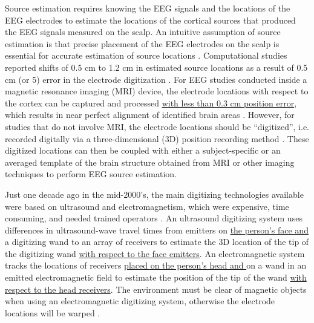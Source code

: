 \documentclass[../thesis_seyed.tex]{subfiles}
\begin{document}
Source estimation requires knowing the EEG signals and the locations of the EEG electrodes to estimate the locations of the cortical sources that produced the EEG signals measured on the scalp. An intuitive assumption of source estimation is that precise placement of the EEG electrodes on the scalp is essential for accurate estimation of source locations \cite{Keil2014-mv}. Computational studies reported shifts of 0.5 cm to 1.2 cm in estimated source locations as a result of 0.5 cm (or 5\textdegree) error in the electrode digitization \cite{Kavanagk1978-zc,Khosla1999-bz,Wang2001-fp,Beltrachini2011-je,Akalin_Acar2013-rv}. For EEG studies conducted inside a magnetic resonance imaging (MRI) device, the electrode locations with respect to the cortex can be captured and processed \ul{with less than 0.3 cm position error}, which results in near perfect alignment of identified brain areas \cite{Marino2016-pu,Scarff2004-ll}. However, for studies that do not involve MRI, the electrode locations should be ``digitized'', i.e. recorded digitally via a three-dimensional (3D) position recording method \cite{Koessler2007-qg}. These digitized locations can then be coupled with either a subject-specific or an averaged template of the brain structure obtained from MRI or other imaging techniques to perform EEG source estimation.  

Just one decade ago in the mid-2000's, the main digitizing technologies available were based on ultrasound and electromagnetism, which were expensive, time consuming, and needed trained operators \cite{Koessler2007-qg,Rodriguez-Calvache2018-qi}. An ultrasound digitizing system uses differences in ultrasound-wave travel times from emitters on \ul{the person's face and} a digitizing wand to an array of receivers to estimate the 3D location of the tip of the digitizing wand \ul{with respect to the face emitters}. An electromagnetic system tracks the locations of receivers \ul{placed on the person's head and }on a wand in an emitted electromagnetic field to estimate the position of the tip of the wand \ul{with respect to the head receivers}. The environment must be clear of magnetic objects when using an electromagnetic digitizing system, otherwise the electrode locations will be warped  \cite{Engels2013-gm,Cline2018-qo}. 
\end{document}
